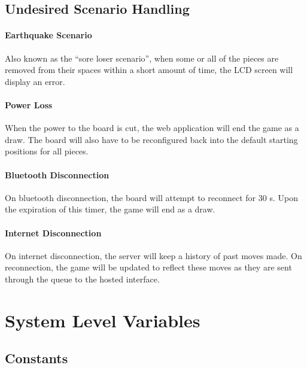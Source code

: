 \documentclass[12pt]{article}
\begin{document}
\subsection{Undesired Scenario Handling}{
    \paragraph{Earthquake Scenario}{
        Also known as the ``sore loser scenario'', when some or all of the pieces are removed from their spaces within a short amount of time, the LCD screen will display an error.
    }
    
    \paragraph{Power Loss}{
        When the power to the board is cut, the web application will end the game as a draw. The board will also have to be reconfigured back into the default starting positions for all pieces.
    }
    
    \paragraph{Bluetooth Disconnection}{
        On bluetooth disconnection, the board will attempt to reconnect for 30 \si{\second}. Upon the expiration of this timer, the game will end as a draw.
    }
    
    \paragraph{Internet Disconnection}{
        On internet disconnection, the server will keep a history of past moves made. On reconnection, the game will be updated to reflect these moves as they are sent through the
        queue to the hosted interface.
    }    
}

\section{System Level Variables}
\subsection{Constants}
\end{document}
